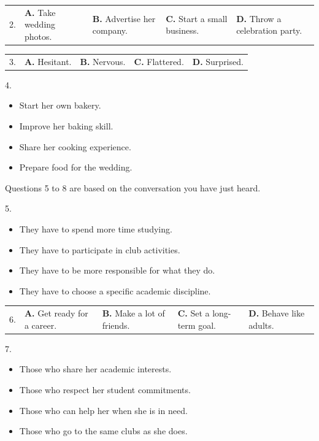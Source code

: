 \documentclass[UTF8,11pt]{ctexart}
\begin{document}
\noindent\begin{tabularx}{\linewidth}{@{}lXXXX@{}}2. & \textbf{A.} Take wedding photos. & \textbf{B.} Advertise her company. & \textbf{C.} Start a small business. & \textbf{D.} Throw a celebration party.\\\end{tabularx}\par

\noindent\begin{tabularx}{\linewidth}{@{}lXXXX@{}}3. & \textbf{A.} Hesitant. & \textbf{B.} Nervous. & \textbf{C.} Flattered. & \textbf{D.} Surprised.\\\end{tabularx}\par

4.


\begin{itemize}[leftmargin=2em,itemsep=.2em,topsep=.4em]\item[A.] Start her own bakery.
\item[B.] Improve her baking skill.
\item[C.] Share her cooking experience.
\item[D.] Prepare food for the wedding.
\end{itemize}

Questions 5 to 8 are based on the conversation you have just heard.


5.


\begin{itemize}[leftmargin=2em,itemsep=.2em,topsep=.4em]\item[A.] They have to spend more time studying.
\item[B.] They have to participate in club activities.
\item[C.] They have to be more responsible for what they do.
\item[D.] They have to choose a specific academic discipline.
\end{itemize}

\noindent\begin{tabularx}{\linewidth}{@{}lXXXX@{}}6. & \textbf{A.} Get ready for a career. & \textbf{B.} Make a lot of friends. & \textbf{C.} Set a long-term goal. & \textbf{D.} Behave like adults.\\\end{tabularx}\par

7.


\begin{itemize}[leftmargin=2em,itemsep=.2em,topsep=.4em]\item[A.] Those who share her academic interests.
\item[B.] Those who respect her student commitments.
\item[C.] Those who can help her when she is in need.
\item[D.] Those who go to the same clubs as she does.
\end{itemize}
\end{document}
